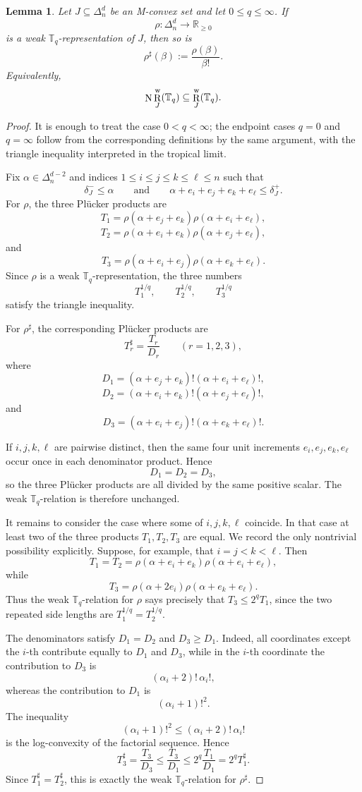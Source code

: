 \documentclass[12pt]{amsart}
\newtheorem{lemma}[theorem]{Lemma}
\theoremstyle{definition}
\newcommand{\1}{\mathbf{1}}
\DeclareMathOperator{\upN}{N}   %
\DeclareMathOperator{\upR}{R}   %
\newcommand\R{{\mathbb R}}
\newcommand\T{{\mathbb T}}
\begin{document}
\begin{lemma}
\label{lem:N-preserves-weak-reps}
Let $J\subseteq \Delta_n^d$ be an M-convex set and let $0\le q\le \infty$. If
\[
\rho:\Delta_n^d\to \R_{\ge 0}
\]
is a weak $\T_q$-representation of $J$, then so is
\[
\rho^\sharp(\beta):=\frac{\rho(\beta)}{\beta!}.
\]
Equivalently,
\[
\upN \upR_J^{\rm w}(\T_q)\subseteq \upR_J^{\rm w}(\T_q).
\]
\end{lemma}

\begin{proof}
It is enough to treat the case $0<q<\infty$; the endpoint cases
$q=0$ and $q=\infty$ follow from the corresponding definitions by the
same argument, with the triangle inequality interpreted in the tropical
limit.

Fix $\alpha\in \Delta_n^{d-2}$ and indices
$1\le i\le j\le k\le \ell\le n$ such that
\[
\delta_J^- \le \alpha
\qquad\text{and}\qquad
\alpha+e_i+e_j+e_k+e_\ell \le \delta_J^+.
\]
For $\rho$, the three Plücker products are
\[
T_1=\rho(\alpha+e_j+e_k)\rho(\alpha+e_i+e_\ell),
\]
\[
T_2=\rho(\alpha+e_i+e_k)\rho(\alpha+e_j+e_\ell),
\]
and
\[
T_3=\rho(\alpha+e_i+e_j)\rho(\alpha+e_k+e_\ell).
\]
Since $\rho$ is a weak $\T_q$-representation, the three numbers
\[
T_1^{1/q},\qquad T_2^{1/q},\qquad T_3^{1/q}
\]
satisfy the triangle inequality.

For $\rho^\sharp$, the corresponding Plücker products are
\[
T_r^\sharp=\frac{T_r}{D_r}\qquad (r=1,2,3),
\]
where
\[
D_1=(\alpha+e_j+e_k)!(\alpha+e_i+e_\ell)!,
\]
\[
D_2=(\alpha+e_i+e_k)!(\alpha+e_j+e_\ell)!,
\]
and
\[
D_3=(\alpha+e_i+e_j)!(\alpha+e_k+e_\ell)!.
\]

If $i,j,k,\ell$ are pairwise distinct, then the same four unit increments
$e_i,e_j,e_k,e_\ell$ occur once in each denominator product. Hence
\[
D_1=D_2=D_3,
\]
so the three Plücker products are all divided by the same positive scalar.
The weak $\T_q$-relation is therefore unchanged.

It remains to consider the case where some of $i,j,k,\ell$ coincide.  In
that case at least two of the three products $T_1,T_2,T_3$ are equal.  We
record the only nontrivial possibility explicitly.  Suppose, for example, that
$i=j<k<\ell$.  Then
\[
T_1=T_2=\rho(\alpha+e_i+e_k)\rho(\alpha+e_i+e_\ell),
\]
while
\[
T_3=\rho(\alpha+2e_i)\rho(\alpha+e_k+e_\ell).
\]
Thus the weak $\T_q$-relation for $\rho$ says precisely that
$T_3 \le 2^q T_1$,
since the two repeated side lengths are $T_1^{1/q}=T_2^{1/q}$.  

The denominators satisfy $D_1=D_2$ and $D_3\ge D_1.$
Indeed, all coordinates except the $i$-th contribute equally to $D_1$ and
$D_3$, while in the $i$-th coordinate the contribution to $D_3$ is
\[
(\alpha_i+2)!\,\alpha_i!,
\]
whereas the contribution to $D_1$ is
\[
(\alpha_i+1)!^2.
\]
The inequality
\[
(\alpha_i+1)!^2\le (\alpha_i+2)!\,\alpha_i!
\]
is the log-convexity of the factorial sequence. Hence
\[
T_3^\sharp=\frac{T_3}{D_3}
\le
\frac{T_3}{D_1}
\le
2^q\frac{T_1}{D_1}
=
2^q T_1^\sharp.
\]
Since $T_1^\sharp=T_2^\sharp$, this is exactly the weak $\T_q$-relation
for $\rho^\sharp$.


\end{proof}
\end{document}
